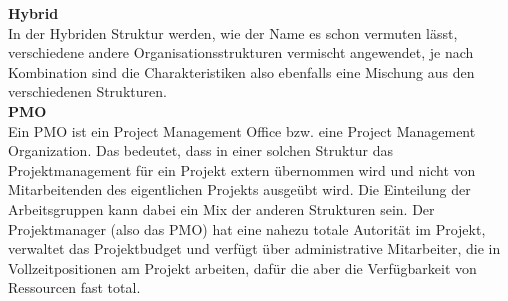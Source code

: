 \documentclass[ThesisDJ.tex]{subfiles}
\begin{document}
\textbf{Hybrid}\\
In der Hybriden Struktur werden, wie der Name es schon vermuten lässt, verschiedene andere Organisationsstrukturen vermischt angewendet, je nach Kombination sind die Charakteristiken also ebenfalls eine Mischung aus den verschiedenen Strukturen.\medskip\\

\textbf{PMO}\\
Ein PMO ist ein Project Management Office bzw. eine Project Management Organization. Das bedeutet, dass in einer solchen Struktur das Projektmanagement für ein Projekt extern übernommen wird und nicht von Mitarbeitenden des eigentlichen Projekts ausgeübt wird. Die Einteilung der Arbeitsgruppen kann dabei ein Mix der anderen Strukturen sein. Der Projektmanager (also das PMO) hat eine nahezu totale Autorität im Projekt, verwaltet das Projektbudget und verfügt über administrative Mitarbeiter, die in Vollzeitpositionen am Projekt arbeiten, dafür die aber die Verfügbarkeit von Ressourcen fast total.
\end{document}
